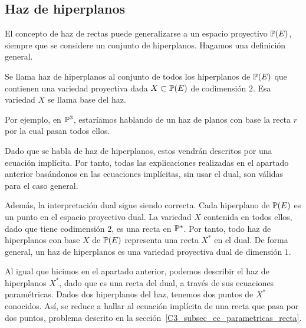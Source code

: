 \subsection{Haz de hiperplanos}
El concepto de haz de rectas puede generalizarse a un espacio proyectivo $\mathbb{P}(E)$, siempre que se considere un conjunto de hiperplanos. Hagamos una definición general.
\begin{defi}
	Se llama haz de hiperplanos al conjunto de todos los hiperplanos de $\mathbb{P}(E)$ que contienen una variedad proyectiva dada $X\subset\mathbb{P}(E)$ de codimensión $2$. Esa variedad $X$ se llama base del haz.
\end{defi}
Por ejemplo, en $\mathbb{P}^3$, estaríamos hablando de un haz de planos con base la recta $r$ por la cual pasan todos ellos.

Dado que se habla de haz de hiperplanos, estos vendrán descritos por una ecuación implícita. Por tanto, todas las explicaciones realizadas en el apartado anterior basándonos en las ecuaciones implícitas, sin usar el dual, son válidas para el caso general.

Además, la interpretación dual sigue siendo correcta. Cada hiperplano de $\mathbb{P}(E)$ es un punto en el espacio proyectivo dual. La variedad $X$ contenida en todos ellos, dado que tiene codimensión $2$, es una recta en $\mathbb{P}^*$. Por tanto, todo haz de hiperplanos con base $X$ de $\mathbb{P}(E)$ representa una recta $X^*$ en el dual. De forma general, un haz de hiperplanos es una variedad proyectiva dual de dimensión $1$. 

Al igual que hicimos en el apartado anterior, podemos describir el haz de hiperplanos $X^*$, dado que es una recta del dual, a través de sus ecuaciones paramétricas. Dados dos hiperplanos del haz, tenemos dos puntos de $X^*$ conocidos. Así, se reduce a hallar al ecuación implícita de una recta que pasa por dos puntos, problema descrito en la sección~\ref{C3_subsec_ec_parametricas_recta}.

